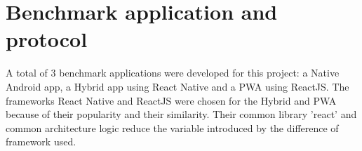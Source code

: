 \documentclass{kththesis}
\begin{document}

\section{Benchmark application and protocol}

A total of 3 benchmark applications were developed for this project: a Native Android app, a Hybrid app using React Native and a PWA using ReactJS. The frameworks React Native and ReactJS were chosen for the Hybrid and PWA because of their popularity and their similarity. Their common library 'react' and common architecture logic reduce the variable introduced by the difference of framework used. %
\end{document}
